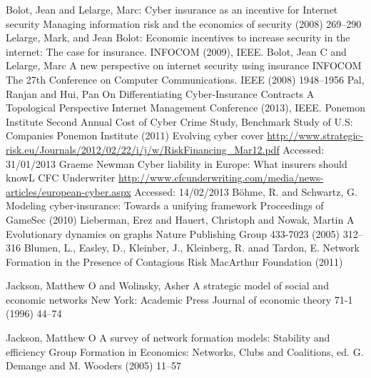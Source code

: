 \documentclass{llncs}
\begin{document}

%
\begin{thebibliography}{[MT1]}
%
 Bolot, Jean and Lelarge, Marc:
 Cyber insurance as an incentive for Internet security
 Managing information risk and the economics of security
 (2008) 269--290
%
	Lelarge, Mark, and Jean Bolot:
	Economic incentives to increase security in the internet: The case for insurance.
	INFOCOM (2009), IEEE.
%
	Bolot, Jean C and Lelarge, Marc
	A new perspective on internet security using insurance
	INFOCOM The 27th Conference on Computer Communications. IEEE
	(2008) 1948--1956
	Pal, Ranjan and Hui, Pan	
	On Differentiating Cyber-Insurance Contracts A Topological Perspective
 	Internet Management Conference (2013), IEEE.
%
Ponemon Institute
Second Annual Cost of Cyber Crime Study, Benchmark Study of U.S: Companies
Ponemon Institute (2011)
%
 Evolving cyber cover
 \url{http://www.strategic-risk.eu/Journals/2012/02/22/i/j/w/RiskFinancing_Mar12.pdf}
 Accessed: 31/01/2013
	Graeme Newman
	Cyber liability in Europe: What insurers should knowL
	CFC Underwriter \url{http://www.cfcunderwriting.com/media/news-articles/european-cyber.aspx}
	Accessed: 14/02/2013
 B{\"o}hme, R. and Schwartz, G.
 Modeling cyber-insurance: Towards a unifying framework
 Proceedings of GameSec (2010)
%
Lieberman, Erez and Hauert, Christoph and Nowak, Martin A
Evolutionary dynamics on graphs
Nature Publishing Group 433-7023 (2005) 312--316
%
Blumen, L., Easley, D., Kleinber, J.,  Kleinberg, R. anad Tardon, E.
Network Formation in the Presence of Contagious Risk
MacArthur Foundation (2011)

 
 Jackson, Matthew O and Wolinsky, Asher
 A strategic model of social and economic networks
 New York: Academic Press Journal of economic theory 71-1 (1996) 44--74

%
Jackson, Matthew O
A survey of network formation models: Stability and efficiency
Group Formation in Economics: Networks, Clubs and Coalitions, ed. G. Demange and M. Wooders (2005) 11--57


\end{thebibliography}
%
\end{document}
